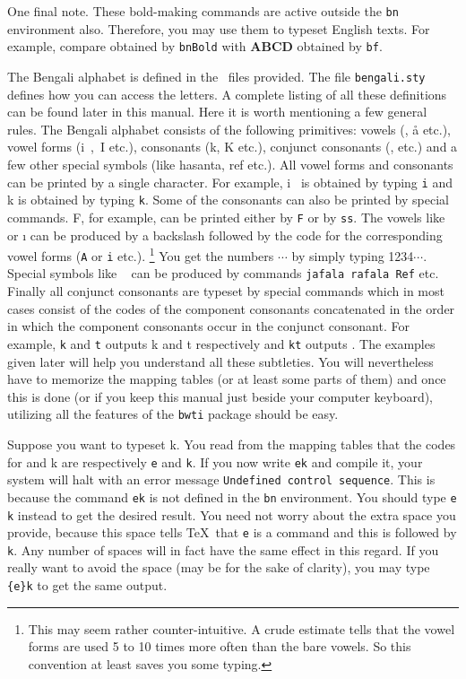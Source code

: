 One final note. These bold-making commands are active outside the
{\tt\bs bn} environment also. Therefore, you may use them to typeset
English texts. For example, compare
 obtained by {\tt\bs bnBold} with {\Large\bf ABCD}
obtained by {\tt\bs bf}.

The Bengali alphabet is defined in the \METAFONT\ files provided. The file
{\tt bengali.sty} defines how you can access the letters. A complete
listing of all these definitions can be found later in this manual.
Here it is worth mentioning a few general rules. The Bengali alphabet
consists of the following primitives: vowels ({\bn \a, \aa} etc.),
vowel forms ({\bn i\ ,\ I} etc.), consonants ({\bn k, K} etc.),
conjunct consonants ({\bn \kk, \nchh} etc.) and a few other special
symbols (like hasanta, ref etc.).
All vowel forms and consonants
can be printed by a single character. For example, {\bn i\ } is obtained by
typing {\tt i} and {\bn k} is obtained by typing {\tt k}. Some of the
consonants can also be printed by special commands. {\bn F}, for example,
can be printed either by {\tt F} or by {\tt \bs ss}. The vowels
like {\bn \A} or {\bn \i} can be produced by a backslash followed
by the code for the corresponding vowel forms ({\tt \bs A} or {\tt \bs i} etc.).
\footnote{This may seem rather counter-intuitive. A crude estimate tells that
the vowel forms are used 5 to 10 times more often than the bare vowels.
So this convention at least saves you some typing.}
You get the numbers {}$\cdots$ by simply typing 1234$\cdots$.
Special symbols like {\bn \jafala\hspace*{1em} \rafala\ \Ref} can be produced by commands
{\tt \bs jafala \bs rafala \bs Ref} etc. Finally all conjunct consonants
are typeset by special commands which in most cases consist of the codes
of the component consonants concatenated in the order in which the
component consonants occur in the conjunct consonant. For example, {\tt k} and
{\tt t} outputs {\bn k} and {\bn t} respectively and {\tt \bs kt} outputs {\bn \kt}.
The examples given later will help you understand all
these subtleties. You will nevertheless have to memorize the mapping tables
(or at least some parts of them) and once this is done (or if you keep
this manual just beside your computer keyboard), utilizing all the features
of the {\tt bwti} package should be easy.

Suppose you want to typeset {\bn \e k}. You read from the mapping tables
that the codes for {\bn \e} and {\bn k} are respectively
{\tt \bs e} and {\tt k}. If you now write {\tt \bs ek} and
compile it, your system will halt with an error message
{\tt Undefined control sequence}. This is because the command {\tt \bs ek}
is not defined in the {\tt \bs bn} environment. You should type
{\tt \bs e k} instead to get the desired result. You need not worry about
the extra space you provide, because this space tells \TeX\ that {\tt \bs e}
is a command and this is followed by {\tt k}. Any number of spaces will
in fact have the same effect in this regard. If you really want to avoid
the space (may be for the sake of clarity), you may type
{\tt \{\bs e\}k} to get the same output.

